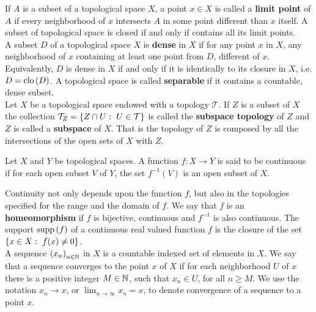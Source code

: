  If $A$ is a subset of a topological space $X$, a point $x\in X$ is called a \textbf{limit point} of $A$ if every neighborhood of $x$ intersects $A$ in some point different than $x$ itself. A subset of topological space is closed if and only if contains all its limit points.    
\\
A subset $D$ of a topological space $X$ is \textbf{dense} in $X$ if for any point $x$ in $X$, any neighborhood of $x$ containing at least one point from $D$, different of $x$. Equivalently, $D$ is dense in $X$ if and only if it is identically to its closure in $X$, i.e. $D=\mathrm{clo}\, (D)$. A topological space is called \textbf{separable} if it contains a countable, dense subset.
\\



Let $X$ be a topological space  endowed with a topology $\mathcal{T}$. If $Z$ is a subset of $X$ the collection $\mathcal{T}_Z=\left\lbrace Z\cap U: \ U \in \mathcal{T} \right\rbrace$ is called the \textbf{subspace topology} of $Z$ and $Z$ is called a \textbf{subspace} of $X$. That is the topology of $Z$ is composed by all the intersections of the open sets of $X$ with $Z$. 


\begin{definition}[Continuity]
Let $X$ and $Y$ be topological spaces. A function $f:X\rightarrow Y$ is said to be continuous if for each open subset $V$ of $Y$, the set $f^{-1}(V)$ is an open subset of $X$.\label{def: Continuity} 
\end{definition}
Continuity not only depends upon the function $f$, but also in the topologies specified for the range and the domain of $f$. We say that $f$ is an \textbf{homeomorphism} if $f$ is bijective, continuous and $f^{-1}$ is also continuous. The support $\mathrm{supp}\,(f)$ of a continuous real valued function $f$ is the closure of the set $\braces{x\in X:\ f(x)\neq 0}$.\\

A sequence $\left( x_n \right)_{n\in \mathbb{N}}$ in $X$ is a countable indexed set of elements in $X$. We say that a sequence converges to the point $x$ of $X$ if for each neighborhood $U$ of $x$ there is a positive integer $M\in\mathbb{N}$, such that $x_n\in U$, for all $n\geq M$. We use the notation $x_n\rightarrow x$, or $\lim_{n\rightarrow \infty} x_n = x$, to denote convergence of a sequence to a point $x$. \\

